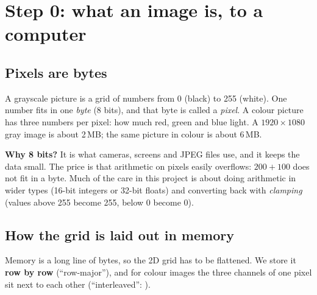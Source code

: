 \chapter{Step 0: what an image is, to a computer}\label{ch:images}

\section{Pixels are bytes}

A grayscale picture is a grid of numbers from 0 (black) to 255 (white). One number fits in one \emph{byte} (8 bits), and that byte is called a \emph{pixel}. A colour picture has three numbers per pixel: how much red, green and blue light. A $1920\times1080$ gray image is about 2\,MB; the same picture in colour is about 6\,MB.

\begin{plain}
\textbf{Why 8 bits?} It is what cameras, screens and JPEG files use, and it keeps the data small. The price is that arithmetic on pixels easily overflows: $200+100$ does not fit in a byte. Much of the care in this project is about doing arithmetic in wider types (16-bit integers or 32-bit floats) and converting back with \emph{clamping} (values above 255 become 255, below 0 become 0).
\end{plain}

\section{How the grid is laid out in memory}

Memory is a long line of bytes, so the 2D grid has to be flattened. We store it \textbf{row by row} (``row-major''), and for colour images the three channels of one pixel sit next to each other (``interleaved'': ).

\begin{center}
\end{center}

